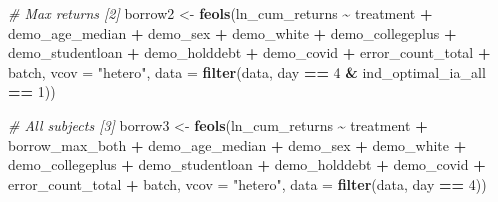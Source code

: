 \documentclass[
]{article}
\newenvironment{Shaded}{\begin{snugshade}}{\end{snugshade}}
\newcommand{\AttributeTok}[1]{\textcolor[rgb]{0.13,0.29,0.53}{#1}}
\newcommand{\CommentTok}[1]{\textcolor[rgb]{0.56,0.35,0.01}{\textit{#1}}}
\newcommand{\DecValTok}[1]{\textcolor[rgb]{0.00,0.00,0.81}{#1}}
\newcommand{\FunctionTok}[1]{\textcolor[rgb]{0.13,0.29,0.53}{\textbf{#1}}}
\newcommand{\NormalTok}[1]{#1}
\newcommand{\OtherTok}[1]{\textcolor[rgb]{0.56,0.35,0.01}{#1}}
\newcommand{\SpecialCharTok}[1]{\textcolor[rgb]{0.81,0.36,0.00}{\textbf{#1}}}
\newcommand{\StringTok}[1]{\textcolor[rgb]{0.31,0.60,0.02}{#1}}
\begin{document}
\begin{Shaded}
\begin{Highlighting}[]
\CommentTok{\# Max returns [2]}
\NormalTok{borrow2 }\OtherTok{\textless{}{-}} \FunctionTok{feols}\NormalTok{(ln\_cum\_returns }\SpecialCharTok{\textasciitilde{}}\NormalTok{ treatment }\SpecialCharTok{+}\NormalTok{ demo\_age\_median }\SpecialCharTok{+}\NormalTok{ demo\_sex }\SpecialCharTok{+}\NormalTok{ demo\_white }\SpecialCharTok{+}\NormalTok{ demo\_collegeplus }\SpecialCharTok{+}\NormalTok{ demo\_studentloan }\SpecialCharTok{+}\NormalTok{ demo\_holddebt }\SpecialCharTok{+}\NormalTok{ demo\_covid }\SpecialCharTok{+}\NormalTok{ error\_count\_total }\SpecialCharTok{+}\NormalTok{ batch, }\AttributeTok{vcov =} \StringTok{"hetero"}\NormalTok{, }\AttributeTok{data =} \FunctionTok{filter}\NormalTok{(data, day }\SpecialCharTok{==} \DecValTok{4} \SpecialCharTok{\&}\NormalTok{ ind\_optimal\_ia\_all }\SpecialCharTok{==} \DecValTok{1}\NormalTok{))}

\CommentTok{\# All subjects [3]}
\NormalTok{borrow3 }\OtherTok{\textless{}{-}} \FunctionTok{feols}\NormalTok{(ln\_cum\_returns }\SpecialCharTok{\textasciitilde{}}\NormalTok{ treatment }\SpecialCharTok{+}\NormalTok{ borrow\_max\_both }\SpecialCharTok{+}\NormalTok{ demo\_age\_median }\SpecialCharTok{+}\NormalTok{ demo\_sex }\SpecialCharTok{+}\NormalTok{ demo\_white }\SpecialCharTok{+}\NormalTok{ demo\_collegeplus }\SpecialCharTok{+}\NormalTok{ demo\_studentloan }\SpecialCharTok{+}\NormalTok{ demo\_holddebt }\SpecialCharTok{+}\NormalTok{ demo\_covid }\SpecialCharTok{+}\NormalTok{ error\_count\_total }\SpecialCharTok{+}\NormalTok{ batch, }\AttributeTok{vcov =} \StringTok{"hetero"}\NormalTok{, }\AttributeTok{data =} \FunctionTok{filter}\NormalTok{(data, day }\SpecialCharTok{==} \DecValTok{4}\NormalTok{))}


\end{Highlighting}
\end{Shaded}
\end{document}
